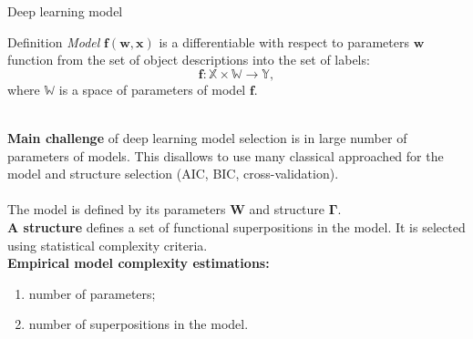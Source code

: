 \documentclass[usenames,dvipsnames,11pt,pdf,utf8,russian,aspectratio=43]{beamer}
\begin{document}
\begin{frame}{Deep learning model}
\small
\begin{block}{Definition}
\textit{Model} $\mathbf{f}(\mathbf{w}, \mathbf{x})$ is a differentiable with respect to parameters $\mathbf{w}$  function from the set of object descriptions into the set of labels:
\[
    \mathbf{f}: \mathbb{X} \times \mathbb{W} \to \mathbb{Y},
\] 
where $\mathbb{W}$ is a space of parameters of model $\mathbf{f}$.
\end{block}
~\\
\textbf{Main challenge} of deep learning model selection is in large number of parameters of models. This disallows to use many classical approached for the model and structure selection (AIC, BIC, cross-validation). \\~\\
The model is defined by its parameters $\mathbf{W}$ and structure $\boldsymbol{\Gamma}$.\\
\textbf{A structure} defines a set of functional superpositions in the model. It is selected using statistical complexity criteria.\\

\textbf{Empirical model complexity estimations:}
\begin{enumerate}
\item number of parameters;
\item number of superpositions in the model.
\end{enumerate}
\end{frame}
\end{document}

